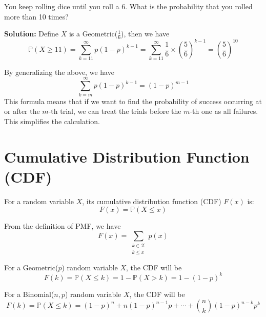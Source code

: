 \begin{eg}
You keep rolling dice until you roll a 6. What is the probability that you rolled more than 10 times? 

\textbf{Solution:} 
Define \(X\) is a Geometric(\(\frac{1}{6}\)), then we have 
\[ 
  \mathbb{P}(X \geq 11) = \sum_{k = 11}^{\infty} p(1 - p)^{k-1} = \sum_{k = 11}^{\infty} \dfrac{1}{6} \times (\dfrac{5}{6})^{k-1} = \left(\dfrac{5}{6}\right)^{10}
\]
\end{eg}

By generalizing the above, we have 
\[
  \sum_{k = m}^{\infty} p(1 - p)^{k-1} = (1 - p)^{m-1}   
\]
This formula means that if we want to find the probability of success occurring at or after the \(m\)-th trial, we can treat the trials before the \(m\)-th one as all failures. This simplifies the calculation.

\section{Cumulative Distribution Function (CDF)}
\begin{definition}
  For a random variable \(X\), its cumulative distribution function (CDF) \(F(x)\) is:
  \[
    F(x) = \mathbb{P}(X \leq x)
  \]
\end{definition}

From the definition of PMF, we have 
\[
  F(x) = \sum_{\substack{k \in \mathcal{X} \\ k \leq x}} p(x) 
\]

For a Geometric(\(p\)) random variable \(X\), the CDF will be 
\[
  F(k) = \mathbb{P}(X \leq k) = 1 - \mathbb{P}(X > k) = 1- (1 - p)^k
\]

For a Binomial(\(n, p\)) random variable \(X\), the CDF will be 
\[
  F(k) = \mathbb{P}(X \leq k) = (1 - p)^n + n(1 - p)^{n-1}p + \cdots + \binom{n}{k} (1 - p)^{n-k} p^k
\]

